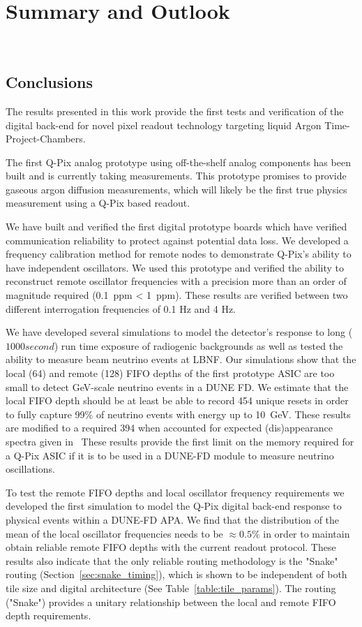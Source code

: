\chapter{Summary and Outlook}~\label{chap:summary}

\section{Conclusions}

The results presented in this work provide the first tests and verification of the digital back-end for novel pixel readout technology targeting liquid Argon Time-Project-Chambers.

The first Q-Pix analog prototype using off-the-shelf analog components has been built and is currently taking measurements.
This prototype promises to provide gaseous argon diffusion measurements, which will likely be the first true physics measurement using a Q-Pix based readout.

We have built and verified the first digital prototype boards which have verified communication reliability to protect against potential data loss.
We developed a frequency calibration method for remote nodes to demonstrate Q-Pix's ability to have independent oscillators.
We used this prototype and verified the ability to reconstruct remote oscillator frequencies with a precision more than an order of magnitude required (0.1~\unit{ppm} < 1~\unit{ppm}).
These results are verified between two different interrogation frequencies of 0.1 Hz and 4 Hz.

We have developed several simulations to model the detector's response to long ($1000 second$) run time exposure of radiogenic backgrounds as well as tested the ability to measure beam neutrino events at LBNF.
Our simulations show that the local (64) and remote (128) FIFO depths of the first prototype ASIC are too small to detect \unit{GeV}-scale neutrino events in a DUNE FD.
We estimate that the local FIFO depth should be at least be able to record 454 unique resets in order to fully capture 99\% of neutrino events with energy up to 10~\unit{GeV}.
These results are modified to a required 394 when accounted for expected (dis)appearance spectra given in~\citep{DUNE_FD_TDRv2_2020}
These results provide the first limit on the memory required for a Q-Pix ASIC if it is to be used in a DUNE-FD module to measure neutrino oscillations.

To test the remote FIFO depths and local oscillator frequency requirements we developed the first simulation to model the Q-Pix digital back-end response to physical events within a DUNE-FD APA.
We find that the distribution of the mean of the local oscillator frequencies needs to be $\approx 0.5\%$ in order to maintain obtain reliable remote FIFO depths with the current readout protocol. 
These results also indicate that the only reliable routing methodology is the "Snake" routing (Section~\ref{sec:snake_timing}), which is shown to be independent of both tile size and digital architecture (See Table~\ref{table:tile_params}).
The routing ("Snake") provides a unitary relationship between the local and remote FIFO depth requirements.

